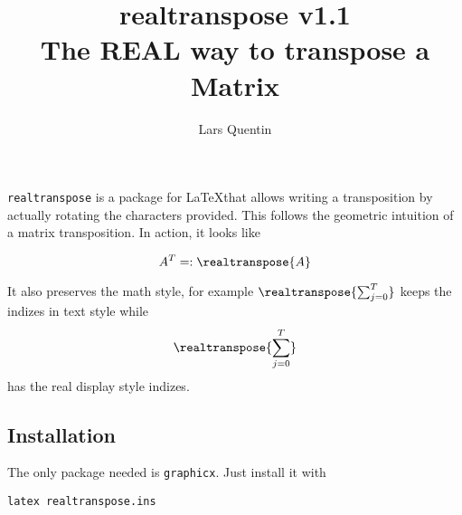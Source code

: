 \documentclass{article}
\title{realtranspose v1.1\\The REAL way to transpose a Matrix}
\author{Lars Quentin}
\begin{document}
\maketitle

\texttt{realtranspose} is a package for \LaTeX that allows writing a transposition by 
actually rotating the characters provided. This follows the geometric intuition of a
matrix transposition. In action, it looks like

\[
  A^T =: \realtranspose{A}
\]

It also preserves the math style, for example $\realtranspose{ \sum_{j = 0}^T }$ keeps
the indizes in text style while
\[
\realtranspose{ \sum_{j = 0}^T }
\]
has the real display style indizes.
\subsection*{Installation}
The only package needed is \texttt{graphicx}. Just install it with
\begin{lstlisting}
latex realtranspose.ins
\end{lstlisting}
\end{document}
